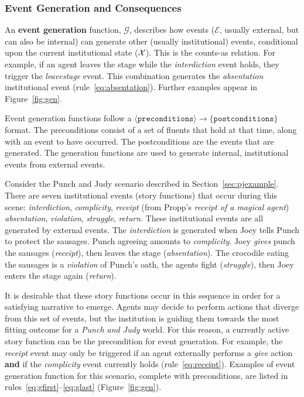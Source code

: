 \documentclass[11pt]{report}
\begin{document}

\subsubsection{Event Generation and Consequences}
An \textbf{event generation} function, $\mathcal{G}$, describes how events
($\mathcal{E}$, usually external, but can also be internal) %
can generate other (usually institutional) events, conditional upon the current institutional state ($\cal X$). This is the counts-as relation.  For example, if an agent leaves the stage while the \emph{interdiction} event holds, they trigger the \emph{leavestage} event. This combination generates the \emph{absentation} institutional event (rule~\ref{eq:absentation}). Further examples appear in Figure~\ref{fig:gen}.

Event generation functions follow a $\langle \mathtt{preconditions} \rangle \rightarrow \{\mathtt{postconditions}\}$ format. The preconditions consist of a set of fluents that hold at that time, along with an event to have occurred. The postconditions are the events that are generated. The generation functions are used to generate internal, institutional events from external events.

Consider the Punch and Judy scenario described in Section~\ref{sec:pjexample}. There are seven institutional events (story functions) that occur during this scene: \emph{interdiction}, \emph{complicity}, \emph{receipt} (from Propp's \emph{receipt of a magical agent}) \emph{absentation}, \emph{violation}, \emph{struggle}, \emph{return}.
These institutional events are all generated by external events. The \emph{interdiction} is generated when Joey tells Punch to protect the sausages. Punch agreeing amounts to \emph{complicity}. Joey \emph{gives} punch the sausages (\emph{receipt}), then leaves the stage (\emph{absentation}). The crocodile eating the sausages is a \emph{violation} of Punch's oath, the agents fight (\emph{struggle}), then Joey enters the stage again (\emph{return}).

It is desirable that these story functions occur in this sequence in order for a satisfying narrative to emerge. Agents may decide to perform actions that diverge from this set of events, but the institution is guiding them towards the most fitting outcome for a \emph{Punch and Judy} world. For this reason, a currently active story function can be the precondition for event generation. For example, the \emph{receipt} event may only be triggered if an agent externally performs a \emph{give} action \textbf{and} if the \emph{complicity} event currently holds (rule~\ref{eq:receipt}).
Examples of event generation function for this scenario, complete with preconditions, are listed in rules~\ref{eq:gfirst}--\ref{eq:glast} (Figure~\ref{fig:gen}).
\end{document}
